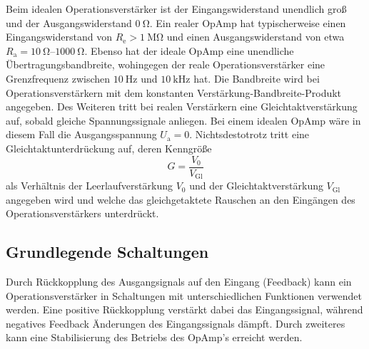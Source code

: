Beim idealen Operationsverstärker ist der Eingangswiderstand unendlich groß und der Ausgangswiderstand $\qty{0}{\ohm}$. Ein realer OpAmp hat typischerweise einen Eingangswiderstand
von $R_\text{e} > \qty{1}{\mega\ohm}$ und einen Ausgangswiderstand von etwa $R_\text{a} = \qtyrange[range-phrase = -]{10}{1000}{\ohm}$.
Ebenso hat der ideale OpAmp eine unendliche Übertragungsbandbreite, wohingegen der reale Operationsverstärker eine Grenzfrequenz zwischen $\qty{10}{\hertz}$ und 
$\qty{10}{\kilo\hertz}$ hat. Die Bandbreite wird bei Operationsverstärkern mit dem konstanten Verstärkung-Bandbreite-Produkt angegeben.
Des Weiteren tritt bei realen Verstärkern eine Gleichtaktverstärkung auf, sobald gleiche Spannungssignale anliegen. 
Bei einem idealen OpAmp wäre in diesem Fall die Ausgangsspannung $U_\text{a} = 0$.
Nichtsdestotrotz tritt eine Gleichtaktunterdrückung auf, deren Kenngröße
\begin{equation}
    G = \frac{V_0}{V_\text{Gl}}
    \label{eq:Gleichtakt}
\end{equation}
als Verhältnis der Leerlaufverstärkung $V_0$ und der Gleichtaktverstärkung $V_\text{Gl}$ angegeben wird und welche das gleichgetaktete Rauschen an den Eingängen
des Operationsverstärkers unterdrückt.

\subsection{Grundlegende Schaltungen}
Durch Rückkopplung des Ausgangsignals auf den Eingang (Feedback) kann ein Operationsverstärker in Schaltungen mit unterschiedlichen Funktionen verwendet werden.
Eine positive Rückkopplung verstärkt dabei das Eingangssignal, während negatives Feedback Änderungen des Eingangssignals dämpft.
Durch zweiteres kann eine Stabilisierung des Betriebs des OpAmp's erreicht werden.

